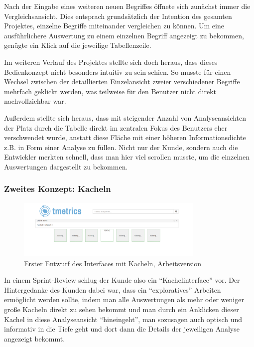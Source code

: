 Nach der Eingabe eines weiteren neuen Begriffes öffnete sich zunächst immer die Vergleichsansicht. Dies entsprach grundsätzlich der Intention des gesamten Projektes, einzelne Begriffe miteinander vergleichen zu können. Um eine ausführlichere Auswertung zu einem einzelnen Begriff angezeigt zu bekommen, genügte ein Klick auf die jeweilige Tabellenzeile.

Im weiteren Verlauf des Projektes stellte sich doch heraus, dass dieses Bedienkonzept nicht besonders intuitiv zu sein schien. So musste für einen Wechsel zwischen der detaillierten Einzelansicht zweier verschiedener Begriffe mehrfach geklickt werden, was teilweise für den Benutzer nicht direkt nachvollziehbar war.

Außerdem stellte sich heraus, dass mit steigender Anzahl von Analyseansichten der Platz durch die Tabelle direkt im zentralen Fokus des Benutzers eher verschwendet wurde, anstatt diese Fläche mit einer höheren Informationsdichte z.B. in Form einer Analyse zu füllen. Nicht nur der Kunde, sondern auch die Entwickler merkten schnell, dass man hier viel scrollen musste, um die einzelnen Auswertungen dargestellt zu bekommen.

\subsubsection{Zweites Konzept: Kacheln}
\label{sec:konzeptKacheln}

\begin{figure}[h!]
 \centering
 \includegraphics[width=0.8\textwidth]{./Bilder/Frontend/Screenshots/kachelinterface.png}
\caption{Erster Entwurf des Interfaces mit Kacheln, Arbeitsversion}
\label{img:kachel}
\end{figure}

In einem Sprint-Review schlug der Kunde also ein "`Kachelinterface"' vor. Der Hintergedanke des Kunden dabei war, dass ein "`exploratives"' Arbeiten ermöglicht werden sollte, indem man alle Auswertungen als mehr oder weniger große Kacheln direkt zu sehen bekommt und man durch ein Anklicken dieser Kachel in diese Analyseansicht "`hineingeht"', man sozusagen auch optisch und informativ in die Tiefe geht und dort dann die Details der jeweiligen Analyse angezeigt bekommt.


